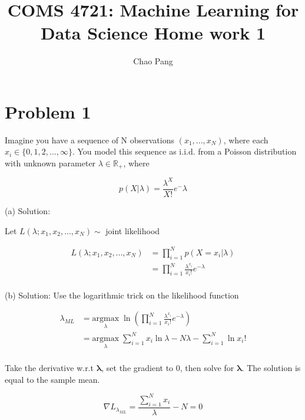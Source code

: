 \documentclass[11pt]{report}
\begin{document}
\title{COMS 4721: Machine Learning for Data Science 
Home work 1}
\author{Chao Pang}
 
\maketitle

\section{Problem 1}
Imagine you have a sequence of N observations $(x_1,...,x_N)$, where each $x_i \in \{0,1,2,...,\infty\}$. You
model this sequence as i.i.d. from a Poisson distribution with unknown parameter $\lambda \in \mathbb{R}_+$, where

\[ p(X|\lambda) = \frac{ \lambda^X}{X!}e^-\lambda \]

\justify
(a) Solution: 

\begin{center}
Let $L(\lambda; x_1, x_2 , ..., x_N)  \sim$ joint likelihood
\end{center}

\begin{equation*}
\begin{split}
L(\lambda; x_1, x_2 , ..., x_N)  & = \prod_{i=1}^N p(X=x_i| \lambda) \\
&  = \prod_{i=1}^N\frac{\lambda^{x_i}}{x_i!} e^{-\lambda} \\
\end{split}
\end{equation*}


\justify
(b) Solution: 
Use the logarithmic trick on the likelihood function

\begin{equation*}
\begin{split}
\lambda_{ML} & = \underset{\lambda}{\mathrm{argmax}} \; \ln{(\prod_{i=1}^N\frac{\lambda^{x_i}}{x_i!} e^{-\lambda})} \\
& = \underset{\lambda}{\mathrm{argmax}} \; {\sum_{i=1}^N{x_i}\ln{\lambda} }  - {N\lambda}  -  {\sum_{i=1}^N\ln{x_i!}}\\
\end{split}
\end{equation*}

\justify
Take the derivative w.r.t $\boldsymbol{\lambda}$, set the gradient to 0, then solve for $\boldsymbol{\lambda}$. The solution is equal to the sample mean. 

\begin{equation*}
\nabla{L_{\lambda_{ML}}} = {\frac{\sum_{i=1}^N{x_i}}{\lambda}} - N = 0
\end{equation*}
\end{document}
